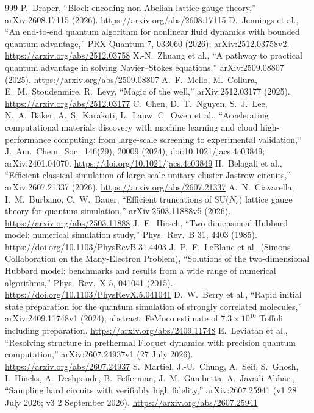 \documentclass[10pt,a4paper]{article}
\begin{document}
\begin{thebibliography}{999}
 P.~Draper, ``Block encoding non-Abelian lattice gauge theory,'' arXiv:2608.17115 (2026). \url{https://arxiv.org/abs/2608.17115}
 D.~Jennings et al., ``An end-to-end quantum algorithm for nonlinear fluid dynamics with bounded quantum advantage,'' PRX Quantum 7, 033060 (2026); arXiv:2512.03758v2. \url{https://arxiv.org/abs/2512.03758}
 X.-N.~Zhuang et al., ``A pathway to practical quantum advantage in solving Navier--Stokes equations,'' arXiv:2509.08807 (2025). \url{https://arxiv.org/abs/2509.08807}
 A.~F.~Mello, M.~Collura, E.~M.~Stoudenmire, R.~Levy, ``Magic of the well,'' arXiv:2512.03177 (2025). \url{https://arxiv.org/abs/2512.03177}
 C.~Chen, D.~T.~Nguyen, S.~J.~Lee, N.~A.~Baker, A.~S.~Karakoti, L.~Lauw, C.~Owen et al., ``Accelerating computational materials discovery with machine learning and cloud high-performance computing: from large-scale screening to experimental validation,'' J.\ Am.\ Chem.\ Soc.\ 146(29), 20009 (2024), doi:10.1021/jacs.4c03849; arXiv:2401.04070. \url{https://doi.org/10.1021/jacs.4c03849}
 H.~Belagali et al., ``Efficient classical simulation of large-scale unitary cluster Jastrow circuits,'' arXiv:2607.21337 (2026). \url{https://arxiv.org/abs/2607.21337}
 A.~N.~Ciavarella, I.~M.~Burbano, C.~W.~Bauer, ``Efficient truncations of SU($N_c$) lattice gauge theory for quantum simulation,'' arXiv:2503.11888v5 (2026). \url{https://arxiv.org/abs/2503.11888}
 J.~E.~Hirsch, ``Two-dimensional Hubbard model: numerical simulation study,'' Phys.\ Rev.\ B 31, 4403 (1985). \url{https://doi.org/10.1103/PhysRevB.31.4403}
 J.~P.~F.~LeBlanc et al.\ (Simons Collaboration on the Many-Electron Problem), ``Solutions of the two-dimensional Hubbard model: benchmarks and results from a wide range of numerical algorithms,'' Phys.\ Rev.\ X 5, 041041 (2015). \url{https://doi.org/10.1103/PhysRevX.5.041041}
 D.~W.~Berry et al., ``Rapid initial state preparation for the quantum simulation of strongly correlated molecules,'' arXiv:2409.11748v1 (2024); abstract: FeMoco estimate of $7.3\times10^{10}$ Toffoli including preparation. \url{https://arxiv.org/abs/2409.11748}
 E.~Leviatan et al., ``Resolving structure in prethermal Floquet dynamics with precision quantum computation,'' arXiv:2607.24937v1 (27 July 2026). \url{https://arxiv.org/abs/2607.24937}
 S.~Martiel, J.-U.~Chung, A.~Seif, S.~Ghosh, I.~Hincks, A.~Deshpande, B.~Fefferman, J.~M.~Gambetta, A.~Javadi-Abhari, ``Sampling hard circuits with verifiably high fidelity,'' arXiv:2607.25941 (v1 28 July 2026; v3 2 September 2026). \url{https://arxiv.org/abs/2607.25941}

\end{thebibliography}
\end{document}
